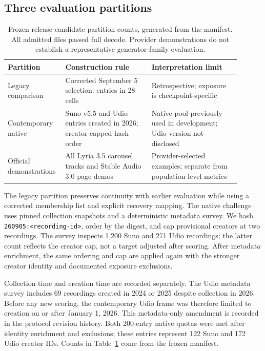 \documentclass[10pt,a4paper]{article}
\begin{document}
\subsection{Three evaluation partitions}
\begin{table}[t]
\centering\small
\begin{tabular}{p{0.19\linewidth}p{0.35\linewidth}p{0.36\linewidth}}
\toprule
Partition & Construction rule & Interpretation limit\\
\midrule
Legacy comparison & Corrected September 5 selection: \LegacyEntries{} entries in 28 cells & Retrospective; exposure is checkpoint-specific\\
Contemporary native & \SunoEntries{} Suno v5.5 and \UdioEntries{} Udio entries created in 2026; creator-capped hash order & Native pool previously used in development; Udio version not disclosed\\
Official demonstrations & All \LyriaEntries{} Lyria 3.5 carousel tracks and \StableAudioEntries{} Stable Audio 3.0 page demos & Provider-selected examples; separate from population-level metrics\\
\bottomrule
\end{tabular}
\caption{Frozen release-candidate partition counts, generated from the manifest.
All admitted files passed full decode. Provider demonstrations do not establish
a representative generator-family evaluation.}
\label{tab:partitions}
\end{table}

The legacy partition preserves continuity with earlier evaluation while using a
corrected membership list and explicit recovery mapping. The native challenge
uses pinned collection snapshots and a deterministic metadata survey. We hash
\texttt{260905:<recording-id>}, order by the digest, and cap provisional creators
at two recordings. The survey inspects 1,200 Suno and 271 Udio recordings; the
latter count reflects the creator cap, not a target adjusted after scoring.
After metadata enrichment, the same ordering and cap are applied again with
the stronger creator identity and documented exposure exclusions.

Collection time and creation time are recorded separately. The Udio metadata
survey includes 69 recordings created in 2024 or 2025 despite collection in
2026. Before any new scoring, the contemporary Udio frame was therefore limited
to creation on or after January 1, 2026. This metadata-only amendment is recorded
in the protocol revision history. Both 200-entry native quotas were met after
identity enrichment and exclusions; these entries represent 122 Suno and 172
Udio creator IDs. Counts in Table~\ref{tab:partitions} come from the frozen manifest.
\end{document}
